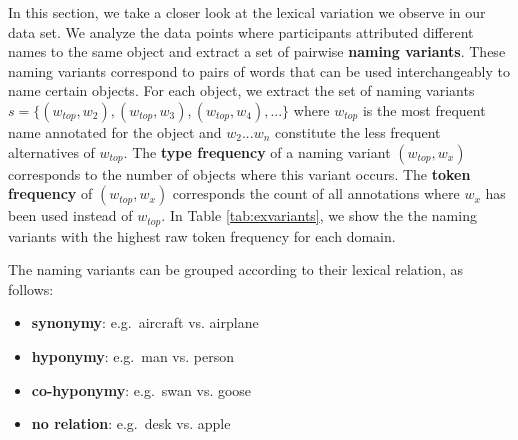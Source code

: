 In this section, we take a closer look at the lexical variation we observe in our data set. We analyze the data points where participants attributed different names to the same object and extract a set of  pairwise \textbf{naming variants}. These naming variants correspond to pairs of words that can be used interchangeably to name certain objects.
For each object, we extract the set of naming variants $s = \{ (w_{top},w_2), (w_{top},w_3), (w_{top},w_4),... \}$  where $w_{top}$ is the most frequent name annotated for the object and $w_2 ... w_n$ constitute the less frequent alternatives of $w_{top}$.  The  \textbf{type frequency} of a naming variant $(w_{top},w_x)$ corresponds to the number of objects where this variant occurs. The \textbf{token frequency} of $(w_{top},w_x)$ corresponds the count of all annotations where $w_x$ has been used instead of $w_{top}$.
In Table \ref{tab:exvariants}, we show the the naming variants with the highest raw token frequency for each domain. 

The naming variants can be grouped according to their lexical relation, as follows:

\begin{itemize}
\item \textbf{synonymy}: e.g.\ aircraft vs. airplane 
\item \textbf{hyponymy}: e.g.\ man vs. person
\item \textbf{co-hyponymy}: e.g.\ swan vs. goose
\item \textbf{no relation}: e.g.\  desk vs. apple
\end{itemize}


